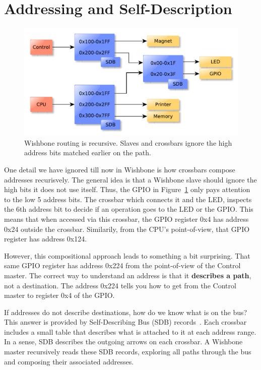 \documentclass[a4paper]{jacow}
\begin{document}
\section{Addressing and Self-Description}

\begin{figure}[t]
  \centering
  \includegraphics*[width=\columnwidth]{addressing}
  \caption{Wishbone routing is recursive. Slaves and crossbars
  ignore the high address bits matched earlier on the path.}
  \label{fig:addressing}
\end{figure}

One detail we have ignored till now in Wishbone is how crossbars compose
addresses recurisvely.
The general idea is that a Wishbone slave should ignore the high bits it
does not use itself.
Thus, the GPIO in Figure~\ref{fig:addressing} only pays attention to the low 
5 address bits.
The crossbar which connects it and the LED,
inspects the 6th address bit to decide if an operation goes to the LED or
the GPIO.
This means that when accessed via this crossbar, 
the GPIO register 0x4 has address 0x24 outside the crossbar.
Similarily, from the CPU's point-of-view, that GPIO register has address 0x124.

However, this compositional approach leads to something a bit surprising.
That same GPIO register has address 0x224 from the point-of-view of 
the Control master.
The correct way to understand an address is that it \textbf{describes a path}, 
not a destination.
The address 0x224 tells you how to get from the Control master to register
0x4 of the GPIO.

If addresses do not describe destinations, how do we know what is on the bus?
This answer is provided by Self-Describing Bus (SDB) records~\cite{sdb}.
Each crossbar includes a small table that describes what is attached to it
at each address range.
In a sense, SDB describes the outgoing arrows on each crossbar.
A Wishbone master recursively reads these SDB records, 
exploring all paths through the bus and composing their associated addresses.
\end{document}

